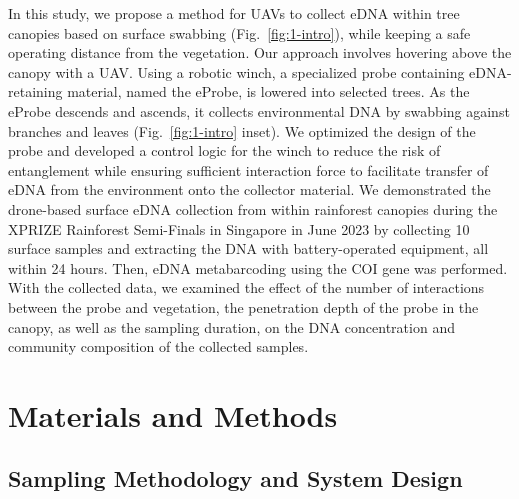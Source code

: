 In this study, we propose a method for \glspl{UAV} to collect \gls{eDNA} within tree canopies based on surface swabbing (Fig.~\ref{fig:1-intro}), while keeping a safe operating distance from the vegetation. Our approach involves hovering above the canopy with a \gls{UAV}. Using a robotic winch, a specialized probe containing eDNA-retaining material, named the eProbe, is lowered into selected trees. As the eProbe descends and ascends, it collects environmental DNA by swabbing against branches and leaves (Fig.~\ref{fig:1-intro} inset). We optimized the design of the probe and developed a control logic for the winch to reduce the risk of entanglement while ensuring sufficient interaction force to facilitate transfer of \gls{eDNA} from the environment onto the collector material. We demonstrated the drone-based surface \gls{eDNA} collection from within rainforest canopies during the XPRIZE Rainforest Semi-Finals in Singapore in June 2023 by collecting 10 surface samples and extracting the DNA with battery-operated equipment, all within 24 hours. Then, \gls{eDNA} metabarcoding using the COI gene was performed. With the collected data, we examined the effect of the number of interactions between the probe and vegetation, the penetration depth of the probe in the canopy, as well as the sampling duration, on the DNA concentration and community composition of the collected samples.


\section{Materials and Methods}
\label{sec:methods}

\subsection{Sampling Methodology and System Design}
\label{sec:methods-probe}

